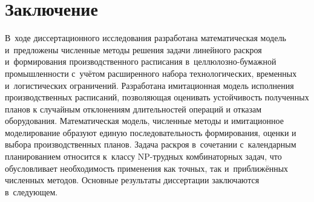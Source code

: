 \chapter*{Заключение}

В~ходе диссертационного исследования разработана математическая модель и~предложены численные методы решения задачи линейного раскроя и~формирования производственного расписания в~целлюлозно-бумажной промышленности с~учётом расширенного набора технологических, временных и~логистических ограничений.
Разработана имитационная модель исполнения производственных расписаний, позволяющая оценивать устойчивость полученных планов к случайным отклонениям длительностей операций и отказам оборудования. Математическая модель, численные методы и имитационное моделирование образуют единую последовательность формирования, оценки и выбора производственных планов.
Задача раскроя в~сочетании с~календарным планированием относится к~классу NP-трудных комбинаторных задач, что обусловливает необходимость применения как точных, так и~приближённых численных методов.
Основные результаты диссертации заключаются в~следующем.

